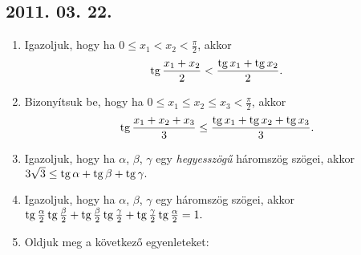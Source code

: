 \subsection*{2011. 03. 22.}
\begin{enumerate}
\item Igazoljuk, hogy ha $0\le x_1<x_2<\frac{\pi}{2}$, akkor \[\tg\frac{x_1+x_2}{2}<\frac{\tg x_1+\tg x_2}{2}.\]
\item Bizonyítsuk be, hogy ha $0\le x_1\le x_2\le x_3<\frac{\pi}{2}$, akkor \[\tg\frac{x_1+x_2+x_3}{3}\le\frac{\tg x_1+\tg x_2+\tg x_3}{3}.\]
\item Igazoljuk, hogy ha $\alpha$, $\beta$, $\gamma$ egy \emph{hegyesszögű} háromszög szögei, akkor $3\sqrt3\le\tg\alpha+\tg\beta+\tg\gamma.$
\item Igazoljuk, hogy ha $\alpha$, $\beta$, $\gamma$ egy háromszög szögei, akkor $\tg\frac{\alpha}{2}\tg\frac{\beta}{2}+\tg\frac{\beta}{2}\tg\frac{\gamma}{2}+\tg\frac{\gamma}{2}\tg\frac{\alpha}{2}=1.$
\item Oldjuk meg a következő egyenleteket:
\end{enumerate}

